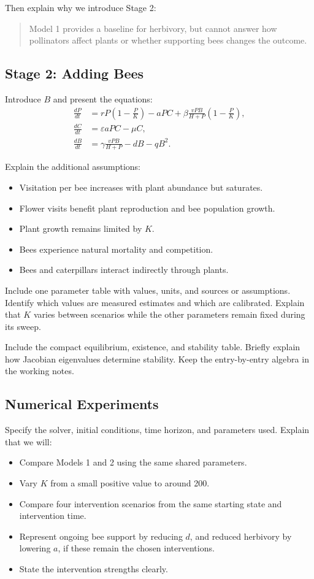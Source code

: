 \documentclass[11pt]{article}
\begin{document}
Then explain why we introduce Stage 2:
\begin{quote}
Model 1 provides a baseline for herbivory, but cannot answer how pollinators
affect plants or whether supporting bees changes the outcome.
\end{quote}

\subsection{Stage 2: Adding Bees}

Introduce $B$ and present the equations:
\begin{align*}
    \frac{dP}{dt}
        &= rP\left(1-\frac{P}{K}\right)-aPC
        +\beta\frac{vPB}{H+P}\left(1-\frac{P}{K}\right), \\
    \frac{dC}{dt} &= \varepsilon aPC-\mu C, \\
    \frac{dB}{dt} &= \gamma\frac{vPB}{H+P}-dB-qB^2.
\end{align*}

Explain the additional assumptions:
\begin{itemize}
    \item Visitation per bee increases with plant abundance but saturates.
    \item Flower visits benefit plant reproduction and bee population growth.
    \item Plant growth remains limited by $K$.
    \item Bees experience natural mortality and competition.
    \item Bees and caterpillars interact indirectly through plants.
\end{itemize}

Include one parameter table with values, units, and sources or assumptions.
Identify which values are measured estimates and which are calibrated.
Explain that $K$ varies between scenarios while the other parameters remain
fixed during its sweep.

Include the compact equilibrium, existence, and stability table. Briefly
explain how Jacobian eigenvalues determine stability. Keep the entry-by-entry
algebra in the working notes.

\subsection{Numerical Experiments}

Specify the solver, initial conditions, time horizon, and parameters used.
Explain that we will:
\begin{itemize}
    \item Compare Models 1 and 2 using the same shared parameters.
    \item Vary $K$ from a small positive value to around 200.
    \item Compare four intervention scenarios from the same starting state
    and intervention time.
    \item Represent ongoing bee support by reducing $d$, and reduced
    herbivory by lowering $a$, if these remain the chosen interventions.
    \item State the intervention strengths clearly.
\end{itemize}
\end{document}

